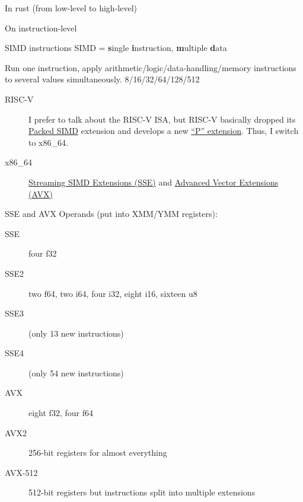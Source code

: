 \documentclass{beamer}
\begin{document}
\begin{frame}[standout]
  In rust (from low-level to high-level)
\end{frame}

\begin{frame}[standout]
  On instruction-level
\end{frame}

\begin{frame}[fragile]{SIMD instructions}
  SIMD = \textbf{s}ingle \textbf{i}nstruction, \textbf{m}ultiple \textbf{d}ata

  Run one instruction, apply arithmetic/logic/data-handling/memory instructions to several values simultaneously. 8/16/32/64/128/512

  \begin{description}
    \item[RISC-V]
      I prefer to talk about the RISC-V ISA, but RISC-V basically dropped its \href{https://en.wikipedia.org/w/index.php?title=RISC-V&oldid=970523444#Packed_SIMD}{Packed SIMD} extension and develops a new \href{https://riscv.org/specifications/isa-spec-pdf/}{\enquote{P} extension}. Thus, I switch to x86\_64.
    \item[x86\_64]
      \href{https://en.wikipedia.org/w/index.php?title=Streaming_SIMD_Extensions&oldid=960385254}{Streaming SIMD Extensions (SSE)} and \href{https://en.wikipedia.org/w/index.php?title=Advanced_Vector_Extensions&oldid=971220867}{Advanced Vector Extensions (AVX)}
  \end{description}
\end{frame}

\begin{frame}[fragile]{SSE and AVX}
  Operands (put into XMM/YMM registers):
  \begin{description}
    \item[SSE] four f32
    \item[SSE2] two f64, two i64, four i32, eight i16, sixteen u8
    \item[SSE3] (only 13 new instructions)
    \item[SSE4] (only 54 new instructions)
    \item[AVX] eight f32, four f64
    \item[AVX2] 256-bit registers for almost everything
    \item[AVX-512] 512-bit registers but instructions split into multiple extensions
  \end{description}
\end{frame}
\end{document}
